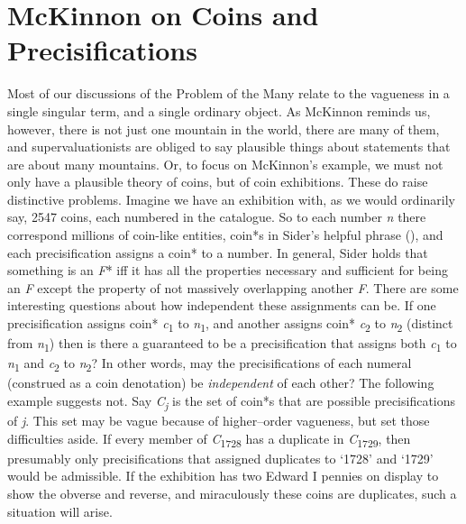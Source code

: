 \documentclass[
  10pt,
  letterpaper,
  DIV=11,
  numbers=noendperiod,
  twoside]{scrartcl}
\begin{document}
\section{McKinnon on Coins and
Precisifications}\label{mckinnon-on-coins-and-precisifications}

Most of our discussions of the Problem of the Many relate to the
vagueness in a single singular term, and a single ordinary object. As
McKinnon reminds us, however, there is not just one mountain in the
world, there are many of them, and supervaluationists are obliged to say
plausible things about statements that are about many mountains. Or, to
focus on McKinnon's example, we must not only have a plausible theory of
coins, but of coin exhibitions. These do raise distinctive problems.
Imagine we have an exhibition with, as we would ordinarily say, 2547
coins, each numbered in the catalogue. So to each number \emph{n} there
correspond millions of coin-like entities, coin*s in Sider's helpful
phrase (), and each precisification
assigns a coin* to a number. In general, Sider holds that something is
an \emph{F}* iff it has all the properties necessary and sufficient for
being an \emph{F} except the property of not massively overlapping
another \emph{F}. There are some interesting questions about how
independent these assignments can be. If one precisification assigns
coin* \emph{c}\textsubscript{1} to \emph{n}\textsubscript{1}, and
another assigns coin* \emph{c}\textsubscript{2} to
\emph{n}\textsubscript{2} (distinct from \emph{n}\textsubscript{1}) then
is there a guaranteed to be a precisification that assigns both
\emph{c}\textsubscript{1} to \emph{n}\textsubscript{1} and
\emph{c}\textsubscript{2} to \emph{n}\textsubscript{2}? In other words,
may the precisifications of each numeral (construed as a coin
denotation) be \emph{independent} of each other? The following example
suggests not. Say \emph{C\textsubscript{j}} is the set of coin*s that
are possible precisifications of \emph{j}. This set may be vague because
of higher--order vagueness, but set those difficulties aside. If every
member of \emph{C}\textsubscript{1728} has a duplicate in
\emph{C}\textsubscript{1729}, then presumably only precisifications that
assigned duplicates to `1728' and `1729' would be admissible. If the
exhibition has two Edward I pennies on display to show the obverse and
reverse, and miraculously these coins are duplicates, such a situation
will arise.
\end{document}
